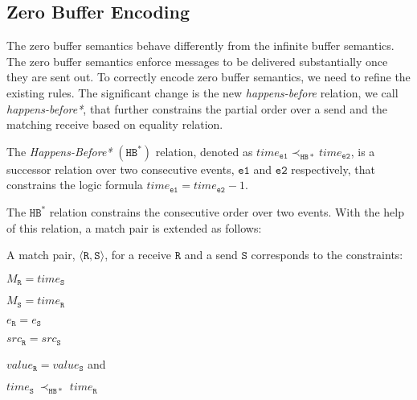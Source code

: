 





\subsection{Zero Buffer Encoding}
The zero buffer semantics behave differently from the infinite buffer semantics.  The zero buffer semantics enforce messages to be delivered substantially once they are sent out. To correctly encode zero buffer semantics, we need to refine the existing rules. The significant change is the new \emph{happens-before} relation, we call \textit{happens-before*}, that further constrains the partial order over a send and the matching receive based on equality relation. 

\begin{definition}
The \emph{Happens-Before*} $(\mathtt{HB^*})$ relation, denoted as
$\mathit{time}_\mathtt{e1} \mathrm{\prec_\mathtt{HB*}} \mathit{time}_\mathtt{e2}$, is a successor relation over two consecutive events, $\mathtt{e1}$ and $\mathtt{e2}$ respectively, that constrains the logic formula $\mathit{time}_\mathtt{e1} =  \mathit{time}_\mathtt{e2} - 1$.
\label{def:hb*}
\end{definition}

The $\mathtt{HB^*}$ relation constrains the consecutive order over two events. With the help of this relation, a match pair is extended as follows: 

\begin{definition} \label{def:match*}
A match pair, $\langle\mathtt{R}, \mathtt{S}\rangle$, for a receive
$\mathtt{R}$ and a send $\mathtt{S}$ corresponds to the constraints:
\begin{compactenum}
\item $M_{\mathtt{R}} = \mathit{time}_{\mathtt{S}}$
\item $M_{\mathtt{S}} = \mathit{time}_{\mathtt{R}}$
\item $e_{\mathtt{R}} = e_{\mathtt{S}}$
\item $src_\mathtt{R} = src_\mathtt{S}$
\item $\mathit{value}_{\mathtt{R}} = \mathit{value}_{\mathtt{S}}$ and
\item $\mathit{time}_{\mathtt{S}}\ \mathrm{\prec_\mathtt{HB*}}\ \mathit{time}_{\mathtt{R}}$
\end{compactenum}
\end{definition}

